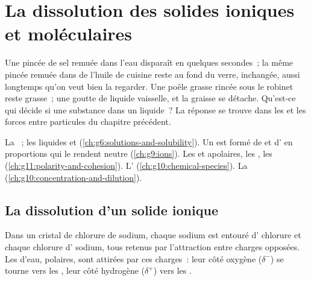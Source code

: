 \chapter{La dissolution des solides ioniques et moléculaires}\label{ch:g11:dissolution}

Une pincée de sel remuée dans l'eau disparaît en quelques secondes~; la
même pincée remuée dans de l'huile de cuisine reste au fond du verre,
inchangée, aussi longtemps qu'on veut bien la regarder. Une poêle grasse
rincée sous le robinet reste grasse~; une goutte de liquide vaisselle, et
la graisse se détache. Qu'est-ce qui décide si une substance 
dans un liquide~? La réponse se trouve dans les  et
les forces entre particules du chapitre précédent.

\begin{recall}
La ~; les liquides  et 
(\cref{ch:g6:solutions-and-solubility}). Un  est formé de
 et d' en proportions qui le rendent neutre
(\cref{ch:g9:ions}). Les  et apolaires, les , les 
(\cref{ch:g11:polarity-and-cohesion}). L'
(\cref{ch:g10:chemical-species}). La 
(\cref{ch:g10:concentration-and-dilution}).
\end{recall}

\section{La dissolution d'un solide ionique}

Dans un cristal de chlorure de sodium, chaque  sodium  est
entouré d' chlorure  et chaque  chlorure d' sodium,
tous retenus par l'attraction entre charges opposées. Les 
d'eau, polaires, sont attirées par ces charges~: leur côté oxygène
($\delta^-$) se tourne vers les , leur côté hydrogène
($\delta^+$) vers les .


